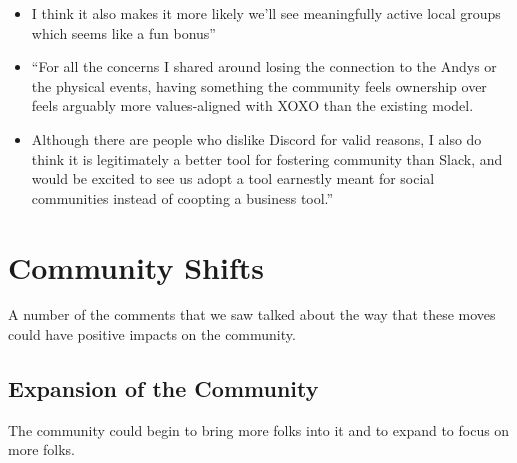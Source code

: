 \documentclass[
]{book}
\begin{document}
\begin{itemize}
\item
  I think it also makes it more likely we'll see meaningfully active local groups which seems like a fun bonus''
\item
  ``For all the concerns I shared around losing the connection to the Andys or the physical events, having something the community feels ownership over feels arguably more values-aligned with XOXO than the existing model.
\item
  Although there are people who dislike Discord for valid reasons, I also do think it is legitimately a better tool for fostering community than Slack, and would be excited to see us adopt a tool earnestly meant for social communities instead of coopting a business tool.''
\end{itemize}

\section{Community Shifts}\label{community-shifts}

A number of the comments that we saw talked about the way that these moves could have positive impacts on the community.

\subsection{Expansion of the Community}\label{expansion-of-the-community}

The community could begin to bring more folks into it and to expand to focus on more folks.
\end{document}
